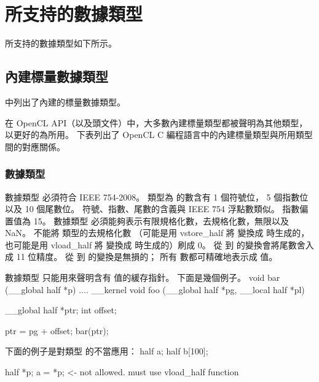 \section{所支持的數據類型}

所支持的數據類型如下所示。

\subsection{內建標量數據類型}

中列出了內建的標量數據類型。


在 OpenCL API（以及頭文件）中，大多數內建標量類型都被聲明為其他類型，
以更好的為所用。
下表列出了 OpenCL C 編程語言中的內建標量類型與所用類型間的對應關係。



\subsubsection{數據類型 }

數據類型  必須符合 IEEE 754-2008。
類型為  的數含有 1 個符號位， 5 個指數位以及 10 個尾數位。
符號、指數、尾數的含義與 IEEE 754 浮點數類似。
指數偏置值為 15。
數據類型  必須能夠表示有限規格化數，去規格化數，無限以及 NaN。
不能將  類型的去規格化數
（可能是用 vstore_half 將  變換成  時生成的，
也可能是用 vload_half 將  變換成  時生成的）刷成 0。
從  到  的變換會將尾數舍入成 11 位精度。
從   到  的變換是無損的；
所有  數都可精確地表示成  值。

數據類型  只能用來聲明含有  值的緩存指針。
下面是幾個例子。
\startclc
void bar (__global half *p)
{
	....
}
__kernel void foo (__global half *pg, __local half *pl)
{
	__global half *ptr;
	int offset;

	ptr = pg + offset;
	bar(ptr);
}
\stopclc

下面的例子是對類型  的不當應用：
\startclc
half a;
half b[100];

half *p;
a = *p;		<- not allowed. must use vload_half function
\stopclc

